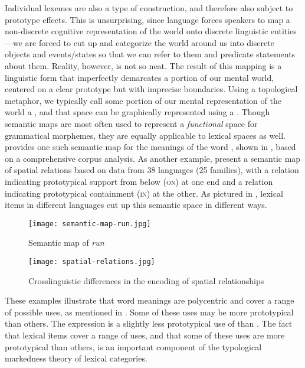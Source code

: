 Individual lexemes are also a type of construction, and therefore also subject to prototype effects. This is unsurprising, since language forces speakers to map a non-discrete cognitive representation of the world onto discrete linguistic entities—we are forced to cut up and categorize the world around us into discrete objects and events/states so that we can refer to them and predicate statements about them. Reality, however, is not so neat. The result of this mapping is a linguistic form that imperfectly demarcates a portion of our mental world, centered on a clear prototype but with imprecise boundaries. Using a topological metaphor, we typically call some portion of our mental representation of the world a  \parencites[140]{Finch2003}, and that space can be graphically represented using a  \parencites[§2.4.3]{Croft2001b}{Haspelmath2003}. Though semantic maps are most often used to represent a \emph{functional} space for grammatical morphemes, they are equally applicable to lexical spaces as well. \textcite[74]{Gries2006} provides one such semantic map for the meanings of the  word , shown in , based on a comprehensive corpus analysis. As another example, \textcite[485]{BowermanChoi2001} present a semantic map of spatial relations based on data from 38 languages (25 families), with a relation indicating prototypical support from below (\textsc{on}) at one end and a relation indicating prototypical containment (\textsc{in}) at the other. As pictured in , lexical items in different languages cut up this semantic space in different ways.

\clearpage
  \begin{figure}[h!]
    \texttt{[image: semantic-map-run.jpg]}
    \caption[Semantic map of English \textit{run}]{Semantic map of  \textit{run} \parencite[74]{Gries2006}}
    \label{fig:semantic-map-run}
  \end{figure}
\clearpage

\begin{figure}[h!]
  \texttt{[image: spatial-relations.jpg]}
  \caption[Crosslinguistic differences in the encoding of spatial relationships]{Crosslinguistic differences in the encoding of spatial relationships \parencite[485]{BowermanChoi2001}}
  \label{fig:spatial-relations}
\end{figure}

These examples illustrate that word meanings are polycentric and cover a range of possible uses, as mentioned in . Some of these uses may be more prototypical than others. The  expression  is a slightly less prototypical use of  than . The fact that lexical items cover a range of uses, and that some of these uses are more prototypical than others, is an important component of the typological markedness theory of lexical categories.


